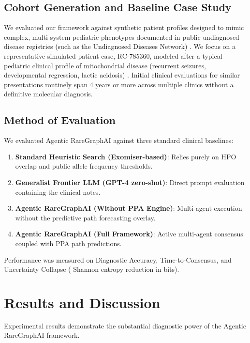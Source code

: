 \documentclass[conference]{IEEEtran}
\begin{document}
\subsection{Cohort Generation and Baseline Case Study}
We evaluated our framework against synthetic patient profiles designed to mimic complex, multi-system pediatric phenotypes documented in public undiagnosed disease registries (such as the Undiagnosed Diseases Network) \cite{ref1}. We focus on a representative simulated patient case, RC-785360, modeled after a typical pediatric clinical profile of mitochondrial disease (recurrent seizures, developmental regression, lactic acidosis) \cite{ref12}. Initial clinical evaluations for similar presentations routinely span 4 years or more across multiple clinics without a definitive molecular diagnosis.

\subsection{Method of Evaluation}
We evaluated Agentic RareGraphAI against three standard clinical baselines:
\begin{enumerate}
    \item \textbf{Standard Heuristic Search (Exomiser-based)}: Relies purely on HPO overlap and public allele frequency thresholds.
    \item \textbf{Generalist Frontier LLM (GPT-4 zero-shot)}: Direct prompt evaluation containing the clinical notes.
    \item \textbf{Agentic RareGraphAI (Without PPA Engine)}: Multi-agent execution without the predictive path forecasting overlay.
    \item \textbf{Agentic RareGraphAI (Full Framework)}: Active multi-agent consensus coupled with PPA path predictions.
\end{enumerate}

Performance was measured on Diagnostic Accuracy, Time-to-Consensus, and Uncertainty Collapse ( Shannon entropy reduction in bits).

\section{Results and Discussion}
Experimental results demonstrate the substantial diagnostic power of the Agentic RareGraphAI framework.
\end{document}
